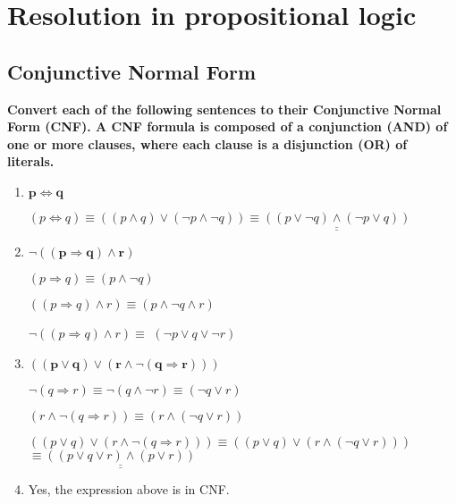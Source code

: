 \section{Resolution in propositional logic}
\subsection{Conjunctive Normal Form}
\begin{large}
    \textbf{Convert each of the following sentences to their Conjunctive Normal Form (CNF).
    A CNF formula is composed of a conjunction (AND) of one or more clauses, where each clause is a disjunction (OR) of literals.}
    \begin{enumerate}
        \item $ \mathbf{p \iff q} $

              $ (p \iff q) \equiv ((p \land q) \lor (\neg p \land \neg q)) \equiv \underline{\underline{((p \lor \neg q) \land (\neg p \lor q))}}$

        \item $ \mathbf{\neg ((p \Rightarrow q) \land r) }$

              $ (p \Rightarrow q ) \equiv  (p \land \neg q) $

              $ (( p \Rightarrow q) \land r) \equiv  (p \land \neg q \land r) $

              $ \neg ((p \Rightarrow q) \land r) \equiv $ \underline{\underline{$(\neg p \lor q \lor \neg r)$}}

        \item $\mathbf{ ((p \lor q) \lor (r \land \neg(q \Rightarrow r))) }$

              $\neg(q \Rightarrow r) \equiv \neg(q \land \neg r) \equiv (\neg q \lor r)$

              $ (r \land \neg(q \Rightarrow r)) \equiv (r \land (\neg q \lor r)) $

              $ ((p \lor q) \lor (r \land \neg(q \Rightarrow r))) \equiv ((p \lor q) \lor (r \land (\neg q \lor r))) $
              $\equiv \underline{\underline{((p \lor q \lor r) \land (p \lor r))}} $

        \item Yes, the expression above is in CNF\@.
    \end{enumerate}
\end{large}


